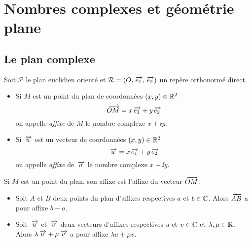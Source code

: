 \documentclass{magnoliaold}
\begin{document}
\section{Nombres complexes et géométrie plane}

\subsection{Le plan complexe}
\begin{definition}
Soit $\mathcal{P}$ le plan euclidien orienté et $\mathcal{R}=\left(O,\kern 2pt\overrightarrow{\kern -2pte_1},\kern 2pt\overrightarrow{\kern -2pte_2}\right)$ un repère orthonormé direct.
\begin{itemize}
\item Si $M$ est un point du plan de coordonnées $(x,y)\in\mathbb{R}^2$
  \[\kern 2pt\overrightarrow{\kern -2ptOM}=x \kern 2pt\overrightarrow{\kern -2pte_1}+y \kern 2pt\overrightarrow{\kern -2pte_2}\]
  on appelle \emph{affixe} de $M$ le nombre complexe $x+\ii y$.
\item Si $\kern 2pt\overrightarrow{\kern -2ptu}$ est un vecteur de coordonnées $(x,y)\in\mathbb{R}^2$
  \[\kern 2pt\overrightarrow{\kern -2ptu}=x \kern 2pt\overrightarrow{\kern -2pte_1}+y \kern 2pt\overrightarrow{\kern -2pte_2}\]
  on appelle \emph{affixe} de $\kern 2pt\overrightarrow{\kern -2ptu}$ le nombre complexe $x+\ii y$.
\end{itemize}
\end{definition}

\begin{remarqueUnique}
\remarque Si $M$ est un point du plan, son affixe est l'affixe du vecteur $\kern 2pt\overrightarrow{\kern -2ptOM}$.
\end{remarqueUnique}

\begin{proposition}
\begin{itemize}
\item Soit $A$ et $B$ deux points du plan d'affixes respectives $a$ et $b\in\mathbb{C}$. Alors $\kern 2pt\overrightarrow{\kern -2ptAB}$ a pour affixe $b-a$.
\item Soit $\kern 2pt\overrightarrow{\kern -2ptu}$ et $\kern 2pt\overrightarrow{\kern -2ptv}$ deux vecteurs d'affixes respectives $u$ et $v\in\mathbb{C}$ et $\lambda,\mu\in\mathbb{R}$. Alors $\lambda\kern 2pt\overrightarrow{\kern -2ptu}+\mu\kern 2pt\overrightarrow{\kern -2ptv}$ a pour affixe $\lambda u+\mu v$.
\end{itemize}
\end{proposition}

\end{document}
